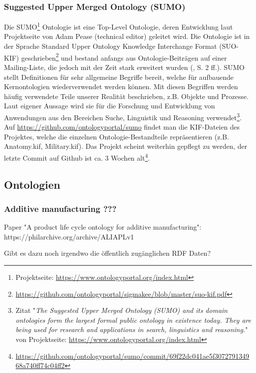 \documentclass{article}
\begin{document}
\subsubsection{Suggested Upper Merged Ontology (SUMO)}

Die SUMO\footnote{Projektseite: \url{https://www.ontologyportal.org/index.html}} Ontologie ist eine Top-Level Ontologie, deren Entwicklung laut Projektseite von Adam Pease (technical editor) geleitet wird.
Die Ontologie ist in der Sprache Standard Upper Ontology Knowledge Interchange Format (SUO-KIF) geschrieben\footnote{\url{https://github.com/ontologyportal/sigmakee/blob/master/suo-kif.pdf}} und
bestand anfangs aus Ontologie-Beiträgen auf einer Mailing-Liste, die jedoch mit der Zeit stark erweitert wurden (\cite{niles2001towards}, S. 2 ff.).
SUMO stellt Definitionen für sehr allgemeine Begriffe bereit, welche für aufbauende Kernontologien wiederverwendet werden können.
Mit diesen Begriffen werden häufig verwendete Teile unserer Realität beschrieben, z.B. Objekte und Prozesse.
Laut eigener Aussage wird sie für die Forschung und Entwicklung von Anwendungen aus den Bereichen Suche, Linguistik und Reasoning verwendet\footnote{Zitat "\textit{The Suggested Upper Merged Ontology (SUMO) and its domain ontologies form the largest formal public ontology in existence today. They are being used for research and applications in search, linguistics and reasoning.}" von Projektseite: \url{https://www.ontologyportal.org/index.html}}.
Auf \url{https://github.com/ontologyportal/sumo} findet man die KIF-Dateien des Projektes, welche die einzelnen Ontologie-Bestandteile repräsentieren (z.B. Anatomy.kif, Military.kif).
Das Projekt scheint weiterhin gepflegt zu werden, der letzte Commit auf Github ist ca. 3 Wochen alt\footnote{\url{https://github.com/ontologyportal/sumo/commit/69f22dc041ae5f307279134968a740ff74c04ff2}}.

\subsection{Ontologien}

\subsubsection{Additive manufacturing ???}

Paper "A product life cycle ontology for additive manufacturing": https://philarchive.org/archive/ALIAPLv1

Gibt es dazu noch irgendwo die öffentlich zugänglichen RDF Daten?
\end{document}

